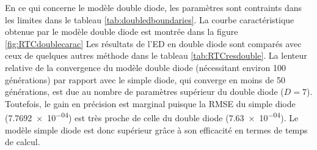 En ce qui concerne le modèle double diode, les paramètres sont contraints dans les limites dans le tableau \ref{tab:doubledboundaries}. La courbe caractéristique obtenue par le modèle double diode est montrée dans la figure \ref{fig:RTCdoublecarac} Les résultats de l'ED en double diode sont comparés avec ceux de quelques autres méthode dans le tableau \ref{tab:RTCresdouble}. La lenteur relative de la convergence du modèle double diode (nécessitant environ 100 générations) par rapport avec le simple diode, qui converge en moins de 50 générations, est due au nombre de paramètres supérieur du double diode ($D = 7$). Toutefois, le gain en précision est marginal puisque la RMSE du simple diode (\num{7.7692e-04}) est très proche de celle du double diode (\num{7.63e-04}). Le modèle simple diode est donc supérieur grâce à son efficacité en termes de temps de calcul.
